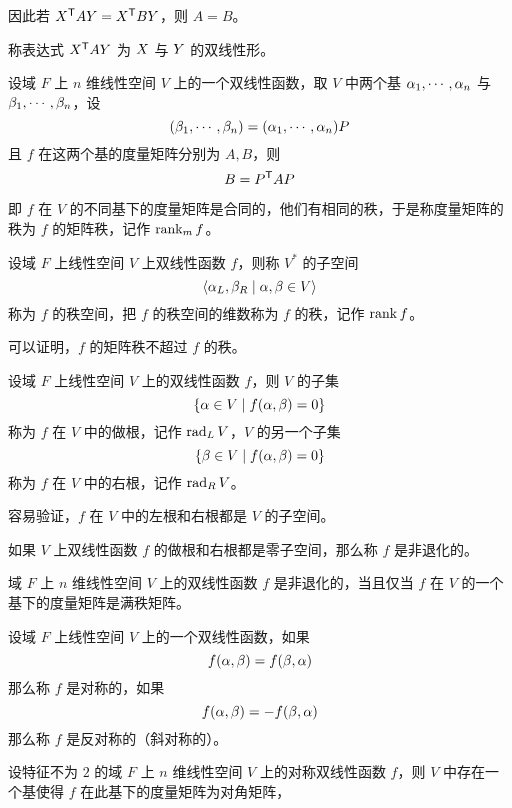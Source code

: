 因此若 ${X}^\mathsf{T}AY = {X}^\mathsf{T}BY$，则 $A = B$。

称表达式 ${X}^\mathsf{T}AY$ 为 $X$ 与 $Y$ 的双线性形。

\begin{theorem}
    设域 $F$ 上 $n$ 维线性空间 $V$ 上的一个双线性函数，取 $V$ 中两个基 $\alpha_1,\cdots,\alpha_n$ 与 $\beta_1,\cdots,\beta_n$，设
    \[ (\beta_1,\cdots,\beta_n) = (\alpha_1,\cdots,\alpha_n)P \]
    且 $f$ 在这两个基的度量矩阵分别为 $A,B$，则
    \[ B = {P}^\mathsf{T}AP \]
\end{theorem}

即 $f$ 在 $V$ 的不同基下的度量矩阵是合同的，他们有相同的秩，于是称度量矩阵的秩为 $f$ 的矩阵秩，记作 $\operatorname{rank}_m f$。

设域 $F$ 上线性空间 $V$ 上双线性函数 $f$，则称 $V^*$ 的子空间
\[ \langle \alpha_L,\beta_R \mid \alpha,\beta \in V \rangle \]
称为 $f$ 的秩空间，把 $f$ 的秩空间的维数称为 $f$ 的秩，记作 $\operatorname{rank} f$。

可以证明，$f$ 的矩阵秩不超过 $f$ 的秩。

\begin{definition}
    设域 $F$ 上线性空间 $V$ 上的双线性函数 $f$，则 $V$ 的子集
    \[ \{ \alpha \in V \mid f(\alpha,\beta) = 0 \} \]
    称为 $f$ 在 $V$ 中的做根，记作 $\operatorname{rad}_{L} V$，$V$ 的另一个子集
    \[ \{ \beta \in V \mid f(\alpha,\beta) = 0 \} \]
    称为 $f$ 在 $V$ 中的右根，记作 $\operatorname{rad}_{R} V$。
\end{definition}

容易验证，$f$ 在 $V$ 中的左根和右根都是 $V$ 的子空间。

\begin{definition}
    如果 $V$ 上双线性函数 $f$ 的做根和右根都是零子空间，那么称 $f$ 是非退化的。
\end{definition}

\begin{theorem}
    域 $F$ 上 $n$ 维线性空间 $V$ 上的双线性函数 $f$ 是非退化的，当且仅当 $f$ 在 $V$ 的一个基下的度量矩阵是满秩矩阵。
\end{theorem}

\begin{definition}
    设域 $F$ 上线性空间 $V$ 上的一个双线性函数，如果
    \[ f(\alpha,\beta) = f(\beta,\alpha) \]
    那么称 $f$ 是对称的，如果
    \[ f(\alpha,\beta) = -f(\beta,\alpha) \]
    那么称 $f$ 是反对称的（斜对称的）。
\end{definition}

\begin{theorem}
    设特征不为 $2$ 的域 $F$ 上 $n$ 维线性空间 $V$ 上的对称双线性函数 $f$，则 $V$ 中存在一个基使得 $f$ 在此基下的度量矩阵为对角矩阵，
\end{theorem}

